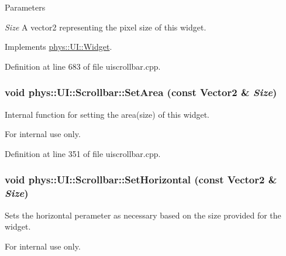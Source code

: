 \begin{DoxyParams}{Parameters}
\item[{\em Size}]A vector2 representing the pixel size of this widget. \end{DoxyParams}


Implements \hyperlink{classphys_1_1UI_1_1Widget_a8c942355474d0b250dfadd4dac4ae400}{phys::UI::Widget}.



Definition at line 683 of file uiscrollbar.cpp.

\hypertarget{classphys_1_1UI_1_1Scrollbar_a82ee692ee5215893d31dab0dd76374ba}{
\subsubsection[{SetArea}]{\setlength{\rightskip}{0pt plus 5cm}void phys::UI::Scrollbar::SetArea (const {\bf Vector2} \& {\em Size})}}
\label{d0/d3e/classphys_1_1UI_1_1Scrollbar_a82ee692ee5215893d31dab0dd76374ba}


Internal function for setting the area(size) of this widget. 

\begin{DoxyInternal}{For internal use only.}
\end{DoxyInternal}


Definition at line 351 of file uiscrollbar.cpp.

\hypertarget{classphys_1_1UI_1_1Scrollbar_acb5622bfb508d54f7802811e5dda4704}{
\subsubsection[{SetHorizontal}]{\setlength{\rightskip}{0pt plus 5cm}void phys::UI::Scrollbar::SetHorizontal (const {\bf Vector2} \& {\em Size})}}
\label{d0/d3e/classphys_1_1UI_1_1Scrollbar_acb5622bfb508d54f7802811e5dda4704}


Sets the horizontal perameter as necessary based on the size provided for the widget. 

\begin{DoxyInternal}{For internal use only.}
\end{DoxyInternal}



